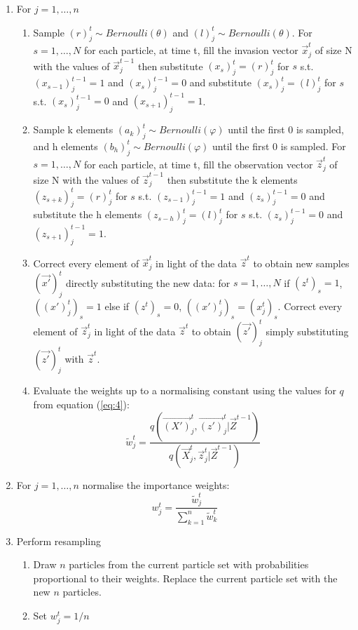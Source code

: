 \begin{algorithm}[H]
\begin{algorithmic}
\begin{enumerate}
	\item For $j = 1, \dots , n$
	\begin{enumerate}
  		\item Sample $(r)^t_j \sim Bernoulli(\theta)$ and $(l)^t_j \sim Bernoulli(\theta)$. For $s = 1, \dots, N$ for each particle, at time t, fill the invasion vector $\vec{x}_j^t$ of size N with the values of $\vec{x}_j^{t-1}$ then substitute $(x_s)^t_j = (r)^t_j$ for $s$ s.t. $(x_{s-1})^{t-1}_j = 1$ and $(x_s)^{t-1}_j = 0$ and substitute $(x_s)^t_j = (l)^t_j$ for $s$ s.t. $(x_s)^{t-1}_j = 0$ and $(x_{s+1})^{t-1}_j = 1$.
  		\item Sample k elements $(a_k)^t_j \sim Bernoulli(\varphi)$ until the first 0 is sampled, and h elements $(b_h)^t_j \sim Bernoulli(\varphi)$ until the first 0 is sampled. For $s = 1, \dots, N$ for each particle, at time t, fill the observation vector $\vec{z}_j^t$ of size N with the values of $\vec{z}_j^{t-1}$ then substitute the k elements $(z_{s+k})^t_j = (r)^t_j$ for $s$ s.t. $(z_{s-1})^{t-1}_j = 1$ and $(z_s)^{t-1}_j = 0$ and substitute the h elements $(z_{s-h})^t_j = (l)^t_j$ for $s$ s.t. $(z_s)^{t-1}_j = 0$ and $(z_{s+1})^{t-1}_j = 1$.
		\item Correct every element of $\vec{x}^t_j$ in light of the data $\vec{z}^t$ to obtain new samples $(\vec{x'})^t_j$ directly substituting the new data: for $s = 1, \dots ,N$ if $(z^t)_s = 1$, $((x')_j^t)_s = 1$ else if $(z^t)_s = 0$, $((x')_j^t)_s = (x^t_j)_s$. Correct every element of $\vec{z}^t_j$ in light of the data $\vec{z}^t$ to obtain $(\vec{z'})^t_j$ simply substituting $(\vec{z'})^t_j$ with $\vec{z}^t$.
		\item Evaluate the weights up to a normalising constant using the values for $q$ from equation (\ref{eq:4}):
		\[
		\tilde{w}^{t}_{j} = \frac{q(\vec{(X')}^{t}_j, \vec{(z')}^{t}_j | \vec{Z}^{t-1})}{q(\vec{X}^{t}_j, \vec{z}^{t}_j | \vec{Z}^{t-1})}
		\]
	\end{enumerate}
	\item For $j = 1, \dots , n$ normalise the importance weights:
	\[
	w^{t}_{j} = \frac{\tilde{w}^t_j}{\sum_{k=1}^{n}\tilde{w}^{t}_k}
	\]
	\item Perform resampling
	\begin{enumerate}
	    \item Draw $n$ particles from the current particle set with probabilities proportional to their weights. Replace the current particle set with the new $n$ particles.
	    \item Set $w^t_j=1/n$
	\end{enumerate}
\end{enumerate}
  
 \end{algorithmic}
\end{algorithm}


